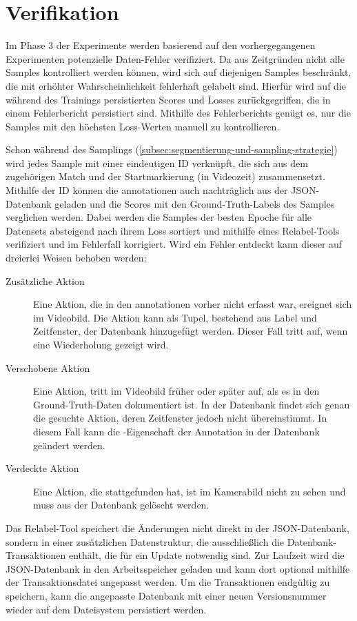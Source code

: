 \section{Verifikation}
\label{sec:nachgang}

Im Phase 3 der Experimente werden basierend auf den vorhergegangenen Experimenten potenzielle Daten-Fehler verifiziert.
Da aus Zeitgründen nicht alle Samples kontrolliert werden können, wird sich auf diejenigen Samples beschränkt, die mit erhöhter Wahrscheinlichkeit fehlerhaft gelabelt sind.
Hierfür wird auf die während des Trainings persistierten Scores und Losses zurückgegriffen, die in einem Fehlerbericht persistiert sind.
Mithilfe des Fehlerberichts genügt es, nur die Samples mit den höchsten Loss-Werten manuell zu kontrollieren.

Schon während des Samplings (\autoref{subsec:segmentierung-und-sampling-strategie}) wird jedes Sample mit einer eindeutigen ID verknüpft, die sich aus dem zugehörigen Match und der Startmarkierung (in Videozeit) zusammensetzt.
Mithilfe der ID können die \gls{annotationen} auch nachträglich aus der JSON-Datenbank geladen und die Scores mit den Ground-Truth-Labels des Samples verglichen werden.
Dabei werden die Samples der besten Epoche für alle Datensets absteigend nach ihrem Loss sortiert und mithilfe eines Relabel-Tools verifiziert und im Fehlerfall \ggf korrigiert.
Wird ein Fehler entdeckt kann dieser auf dreierlei Weisen behoben werden:

\begin{description}
    \item[Zusätzliche Aktion] Eine Aktion, die in den \gls{annotationen} vorher nicht erfasst war, ereignet sich im Videobild.
    Die Aktion kann als Tupel, bestehend aus Label und Zeitfenster, der Datenbank hinzugefügt werden.
    Dieser Fall tritt \zB auf, wenn eine Wiederholung gezeigt wird.
    \item[Verschobene Aktion] Eine Aktion, tritt im Videobild früher oder später auf, als es in den Ground-Truth-Daten dokumentiert ist.
    In der Datenbank findet sich genau die gesuchte Aktion, deren Zeitfenster jedoch nicht übereinstimmt.
    In diesem Fall kann die -Eigenschaft der Annotation in der Datenbank geändert werden.
    \item[Verdeckte Aktion] Eine Aktion, die stattgefunden hat, ist im Kamerabild nicht zu sehen und muss aus der Datenbank gelöscht werden.
\end{description}

Das Relabel-Tool speichert die Änderungen nicht direkt in der JSON-Datenbank, sondern in einer zusätzlichen Datenstruktur, die ausschließlich die Datenbank-Transaktionen enthält, die für ein Update notwendig sind.
Zur Laufzeit wird die JSON-Datenbank in den Arbeitsspeicher geladen und kann dort optional mithilfe der Transaktionsdatei angepasst werden.
Um die Transaktionen endgültig zu speichern, kann die angepasste Datenbank mit einer neuen Versionsnummer wieder auf dem Dateisystem persistiert werden.


